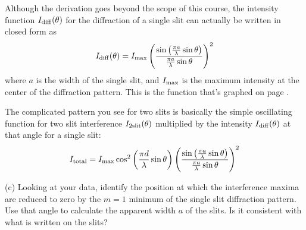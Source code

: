 \pagebreak[2]
Although the derivation goes beyond the scope of this course, the intensity function $I_{\rm{diff}}(\theta)$ for the diffraction of a single slit can actually be written in closed form as
\begin{displaymath} 
I_{\rm{diff}}(\theta) = I_{\rm{max}} \left( \frac {\sin \left(\frac {\pi a} {\lambda} \sin \theta \right)} {\frac {\pi a} {\lambda} \sin \theta} \right)^2 
\end{displaymath}
where $a$ is the width of the single slit, 
and $I_{\rm{max}}$
is the maximum intensity at the center of the diffraction pattern.  This is the function that's graphed on page \pageref{fraunhofer_graph}.




The complicated pattern you see for two slits is basically the simple oscillating function for two slit interference $I_{\rm 2slit}(\theta)$ multiplied by the intensity $I_{\rm{diff}}(\theta)$ at that angle for a single slit: 
\begin{displaymath} 
I_{\rm{total}} = I_{\rm{max}} \cos^2 \left (\frac {\pi d} {\lambda} \sin \theta \right) \left(\frac {\sin \left (\frac {\pi a} {\lambda} \sin \theta \right )} {\frac {\pi a} {\lambda} \sin \theta} \right)^2 \end{displaymath}

(c) Looking at your data, identify the position at which the interference maxima  are reduced to zero by the $m=1$ minimum of the single slit diffraction pattern.  Use that angle to calculate the apparent width $a$ of the slits.  Is it consistent with what is written on the slits?
\answerspace{0.5in}
